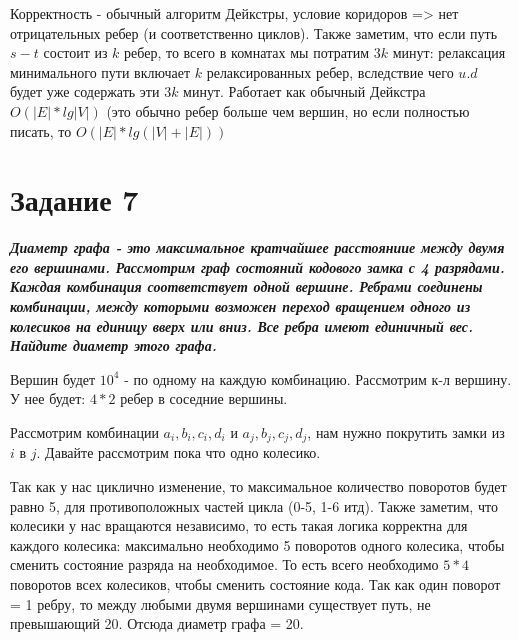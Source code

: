 \documentclass{article}
\begin{document}
Корректность - обычный алгоритм Дейкстры, условие коридоров => нет отрицательных ребер (и соответственно циклов). Также заметим, что если путь $s - t$ состоит из $k$ ребер, то всего в комнатах мы потратим $3k$ минут: релаксация минимального пути включает $k$ релаксированных ребер, вследствие чего $u.d$ будет уже содержать эти $3k$ минут. Работает как обычный Дейкстра $O(|E| *lg|V|)$ (это обычно ребер больше чем вершин, но если полностью писать, то $O(|E| *lg(|V| + |E|))$ 

\bigskip


\section*{\textbf{Задание 7}} \textbf{\textit{Диаметр графа - это максимальное кратчайшее расстояниие между двумя его вершинами. Рассмотрим граф состояний кодового замка с 4 разрядами. Каждая комбинация соответствует одной вершине. Ребрами соединены комбинации, между которыми возможен переход вращением одного из колесиков на единицу вверх или вниз. Все ребра имеют единичный вес. Найдите диаметр этого графа.}}

Вершин будет $10^4$ - по одному на каждую комбинацию. Рассмотрим к-л вершину. У нее будет: $4 * 2$ ребер в соседние вершины. 

Рассмотрим комбинации $a_i, b_i, c_i, d_i$ и $a_j, b_j, c_j, d_j$, нам нужно покрутить замки из $i$ в $j$. Давайте рассмотрим пока что одно колесико.

Так как у нас циклично изменение, то максимальное количество поворотов будет равно 5, для противоположных частей цикла (0-5, 1-6 итд). Также заметим, что колесики у нас вращаются независимо, то есть такая логика корректна для каждого колесика: максимально необходимо 5 поворотов одного колесика, чтобы сменить состояние разряда на необходимое. То есть всего необходимо $5*4$ поворотов всех колесиков, чтобы сменить состояние кода. Так как один поворот = 1 ребру, то между любыми двумя вершинами существует путь, не превышающий 20. Отсюда диаметр графа = 20.

\bigskip
\end{document}
